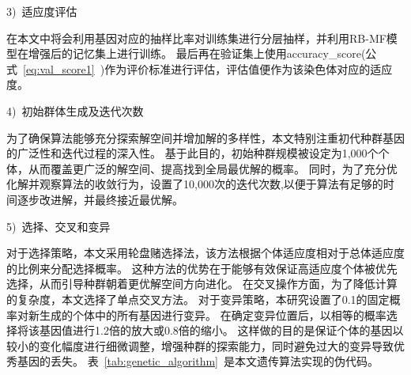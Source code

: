 3)~适应度评估\par
在本文中将会利用基因对应的抽样比率对训练集进行分层抽样，并利用RB-MF模型在增强后的记忆集上进行训练。
最后再在验证集上使用accuracy\_score(公式~\ref{eq:val_score1}~)作为评价标准进行评估，评估值便作为该染色体对应的适应度。\par

4)~初始群体生成及迭代次数\par
为了确保算法能够充分探索解空间并增加解的多样性，本文特别注重初代种群基因的广泛性和迭代过程的深入性。
基于此目的，初始种群规模被设定为1,000个个体，从而覆盖更广泛的解空间、提高找到全局最优解的概率。
同时，为了充分优化解并观察算法的收敛行为，设置了10,000次的迭代次数,以便于算法有足够的时间逐步改进解，并最终接近最优解。\par

5)~选择、交叉和变异\par
对于选择策略，本文采用轮盘赌选择法，该方法根据个体适应度相对于总体适应度的比例来分配选择概率。
这种方法的优势在于能够有效保证高适应度个体被优先选择，从而引导种群朝着更优解空间方向进化。
在交叉操作方面，为了降低计算的复杂度，本文选择了单点交叉方法。
对于变异策略，本研究设置了0.1的固定概率对新生成的个体中的所有基因进行变异。
在确定变异位置后，以相等的概率选择将该基因值进行1.2倍的放大或0.8倍的缩小。
这样做的目的是保证个体的基因以较小的变化幅度进行细微调整，增强种群的探索能力，同时避免过大的变异导致优秀基因的丢失。
表~\ref{tab:genetic_algorithm}~是本文遗传算法实现的伪代码。
